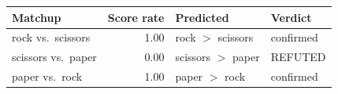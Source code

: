\begin{tabular}{lrll}
\toprule
Matchup & Score rate & Predicted & Verdict \\
\midrule
rock vs.\ scissors & 1.00 & rock $>$ scissors & confirmed \\
scissors vs.\ paper & 0.00 & scissors $>$ paper & REFUTED \\
paper vs.\ rock & 1.00 & paper $>$ rock & confirmed \\
\bottomrule
\end{tabular}
